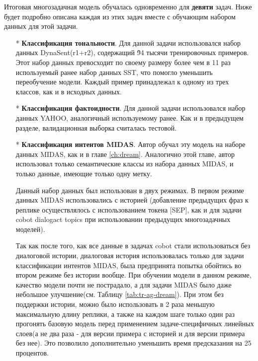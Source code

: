 Итоговая многозадачная модель обучалась одновременно для \textbf{девяти} задач. Ниже будет подробно описана каждая из этих задач вместе с обучающим набором данных для этой задачи. 
\begin{itemize} 
\item[*]\textbf{Классификация тональности}. Для данной задачи использовался набор данных DynaSent(r1+r2)\cite{dynasent}, содержащий \~ 94 тысячи тренировочных примеров. Этот набор данных превосходит по своему размеру более чем в 11 раз используемый ранее набор данных SST\cite{sst}, что помогло уменьшить переобучение модели. Каждый пример принадлежал к одному из трех классов, как и в исходных данных. 

\item[*]\textbf{Классификация фактоидности}. Для данной задачи использовался набор данных YAHOO\cite{yahoo}, аналогичный используемому ранее. Как и в предыдущем разделе, валидационная выборка считалась тестовой. 

\item[*]\textbf{Классификация интентов MIDAS}. Автор обучал эту модель на наборе данных MIDAS, как и в главе \ref{ch:dream}. Аналогично этой главе, автор использовал только семантические классы из набора данных MIDAS, и только данные, имеющие только одну метку. 

Данный набор данных был использован в двух режимах. В первом режиме данных MIDAS использовались с историей (добавление предыдущих фраз к реплике осуществлялось с использованием токена [SEP], как и для задачи {cobot dialogact topics} при использовании предыдущих многозадачных моделей).

Так как после того, как все данные в задачах {cobot} стали использоваться без диалоговой истории, диалоговая история использовалась только для задачи классификации интентов MIDAS, была предпринята попытка обойтись во втором режиме без истории вообще. При обучении модели в данном режиме, качество модели почти не пострадало, а для задачи MIDAS было даже небольшое улучшение(см. Таблицу \ref{tab:tr-ag-dream}). При этом без поддержки истории, можно было использовать в 2 раза меньшую максимальную длину реплики, а также на каждом шаге только один раз прогонять базовую модель перед применением задаче-специфичных линейных слоев(а не два раза - для версии примера с историей и для версии примера без нее). Это позволило дополнительно уменьшить время предсказания на 25 процентов.


\end{itemize}
